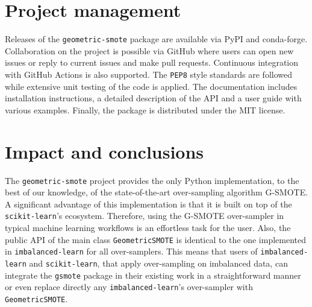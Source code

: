 \documentclass[twoside,11pt]{article}
\begin{document}
\section{Project management}
Releases of the \texttt{geometric-smote} package are available via PyPI and
conda-forge. Collaboration on the project is possible via GitHub where users can
open new issues or reply to current issues and make pull requests. Continuous
integration with GitHub Actions is also supported. The \texttt{PEP8} style
standards are followed while extensive unit testing of the code is applied. The
documentation includes installation instructions, a detailed description of the
API and a user guide with various examples. Finally, the package is distributed
under the MIT license.

\section{Impact and conclusions}
The \texttt{geometric-smote} project provides the only Python implementation, to
the best of our knowledge, of the state-of-the-art over-sampling algorithm
G-SMOTE. A significant advantage of this implementation is that it is built on
top of the \texttt{scikit-learn}'s ecosystem. Therefore, using the G-SMOTE
over-sampler in typical machine learning workflows is an effortless task for the
user. Also, the public API of the main class \texttt{GeometricSMOTE} is
identical to the one implemented in \texttt{imbalanced-learn} for all
over-samplers. This means that users of \texttt{imbalanced-learn} and
\texttt{scikit-learn}, that apply over-sampling on imbalanced data, can
integrate the \texttt{gsmote} package in their existing work in a
straightforward manner or even replace directly any \texttt{imbalanced-learn}'s
over-sampler with \texttt{GeometricSMOTE}.

\vskip 0.2in

\end{document}
